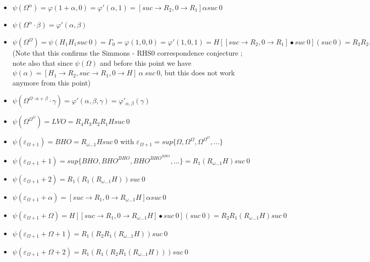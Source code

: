 \documentclass[10pt]{article}
\begin{document}
\begin{itemize}
\item \( \psi(\Omega^\alpha) = \varphi(1+\alpha,0) = \varphi'(\alpha,1) = [suc \rightarrow R_2, 0 \rightarrow R_1] \alpha suc\ 0 \)

\item \( \psi(\Omega^\alpha \cdot \beta) = \varphi'(\alpha,\beta) \)

\item \( \psi(\Omega^\Omega) = \psi(H_1 H_1 suc\ 0) = \Gamma_0 = \varphi(1,0,0) = \varphi'(1,0,1) = H [[suc \rightarrow R_2, 0 \rightarrow R_1] \bullet suc\ 0] (suc\ 0) = R_3 R_2 R_1 H suc\ 0 \) (Note that this confirms the Simmons - RHS0 correspondence conjecture ; note also that since \( \psi(\Omega) \) and before this point we have \( \psi(\alpha) = [H_1 \rightarrow R_2,suc \rightarrow R_1, 0 \rightarrow H]\ \alpha \ suc\ 0 \), but this does not work anymore from this point)

\item \( \psi(\Omega^{\Omega \cdot \alpha + \beta} \cdot \gamma) = \varphi'(\alpha,\beta,\gamma) = \varphi'_{\alpha,\beta}(\gamma) \)

\item \( \psi(\Omega^{\Omega^\Omega}) = LVO = R_4 R_3 R_2 R_1 H suc\ 0 \)
\item \( \psi(\varepsilon_{\Omega+1}) = BHO = R_{\omega \ldots 1} H suc\ 0 \) with \( \varepsilon_{\Omega+1} = sup \lbrace \Omega, \Omega^\Omega, \Omega^{\Omega^\Omega}, \ldots \rbrace \)


\item \( \psi(\varepsilon_{\Omega+1}+1) = sup \lbrace BHO, BHO^{BHO}, BHO^{BHO^{BHO}}, \ldots \rbrace = R_1 (R_{\omega \ldots 1} H) suc\ 0 \)

\item \( \psi(\varepsilon_{\Omega+1}+2) = R_1 (R_1 (R_{\omega \ldots 1} H)) suc\ 0 \)

\item \( \psi(\varepsilon_{\Omega+1}+\alpha) = [suc \rightarrow R_1, 0 \rightarrow R_{\omega \ldots 1} H] \alpha suc\ 0 \)

\item \( \psi(\varepsilon_{\Omega+1}+\Omega) = H [[suc \rightarrow R_1, 0 \rightarrow R_{\omega \ldots 1} H] \bullet suc\ 0] (suc\ 0) = R_2 R_1 (R_{\omega \ldots 1} H) suc\ 0 \)

\item \( \psi(\varepsilon_{\Omega+1}+\Omega+1) = R_1 (R_2 R_1 (R_{\omega \ldots 1} H)) suc\ 0 \)

\item \( \psi(\varepsilon_{\Omega+1}+\Omega+2) = R_1 (R_1 (R_2 R_1 (R_{\omega \ldots 1} H))) suc\ 0 \)


\end{itemize}
\end{document}
